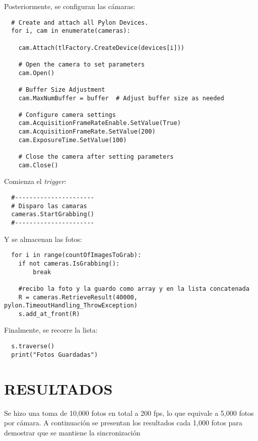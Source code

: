 \documentclass{article}
\begin{document}
\noindent Posteriormente, se configuran las cámaras:

\begin{lstlisting}
  # Create and attach all Pylon Devices.
  for i, cam in enumerate(cameras):
      
    cam.Attach(tlFactory.CreateDevice(devices[i]))

    # Open the camera to set parameters
    cam.Open()

    # Buffer Size Adjustment
    cam.MaxNumBuffer = buffer  # Adjust buffer size as needed
    
    # Configure camera settings
    cam.AcquisitionFrameRateEnable.SetValue(True)
    cam.AcquisitionFrameRate.SetValue(200)
    cam.ExposureTime.SetValue(100) 

    # Close the camera after setting parameters
    cam.Close()
\end{lstlisting}

\newpage
\noindent Comienza el \textit{trigger}:

\begin{lstlisting}
  #----------------------
  # Disparo las camaras
  cameras.StartGrabbing()
  #----------------------
\end{lstlisting}

\noindent Y se almacenan las fotos:

\begin{lstlisting}
  for i in range(countOfImagesToGrab):
    if not cameras.IsGrabbing():
        break

    #recibo la foto y la guardo como array y en la lista concatenada
    R = cameras.RetrieveResult(40000, pylon.TimeoutHandling_ThrowException)
    s.add_at_front(R)
\end{lstlisting}

\noindent Finalmente, se recorre la lista:

\begin{lstlisting}
  s.traverse()
  print("Fotos Guardadas")
\end{lstlisting}

\newpage
\section{RESULTADOS}

\noindent Se hizo una toma de 10,000 fotos en total a 200 fps, lo que equivale a 5,000 fotos por cámara. A continuación se presentan los resultados cada 1,000 fotos para
demostrar que se mantiene la sincronización
\end{document}
